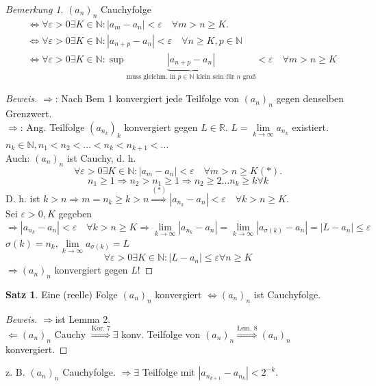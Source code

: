 \documentclass[12pt,a4paper,titlepage]{article} %
\theoremstyle{definition}
\newtheorem{satz}{Satz}[subsection]
\theoremstyle{remark}
\newtheorem*{bem}{Bemerkung}
\newenvironment{bew}{\begin{proof}[Beweis]}{\end{proof}}
\newcommand{\N}{\mathbb{N}}
\newcommand{\R}{\mathbb{R}}
\newcommand{\limes}[1]{\lim\limits_{#1\rightarrow\infty}}
\begin{document}
\begin{bem}
	\( (a_n)_n \) Cauchyfolge \\
	\begin{align*}
		&\Leftrightarrow \forall \varepsilon>0\exists K\in\N:|a_m-a_n|<\varepsilon \quad \forall m>n\geq K.\\
		&\Leftrightarrow \forall \varepsilon>0\exists K\in\N:|a_{n+p}-a_n|<\varepsilon \quad \forall n\geq K, p\in\N\\
		&\Leftrightarrow \forall \varepsilon>0\exists K\in\N:\sup \underbrace{|a_{n+p}-a_n|}_{\text{muss gleichm. in }p\in\N\text{ klein sein für } n \text{ groß} }<\varepsilon \quad \forall m>n\geq K
	\end{align*}
\end{bem}
\begin{bew}
	\glqq\( \Rightarrow \)\grqq: Nach Bem 1 konvergiert jede Teilfolge von \( (a_n)_n \) gegen denselben Grenzwert.\\
	\glqq\(\Rightarrow\)\grqq: Ang. Teilfolge \( (a_{n_k})_k \) konvergiert gegen \(L\in\R\). \(L = \limes{k} a_{n_k} \) existiert.\\
	\( n_k\in\N, n_1<n_2<\ldots<n_k<n_{k+1}<\ldots \)\\
	Auch: \((a_n)_n\) ist Cauchy, d. h. 
	\[ \forall \varepsilon>0\exists K\in\N:|a_m-a_n|<\varepsilon \quad\forall m>n\geq K (*). \]
	\[n_1 \geq 1 \Rightarrow n_2 > n_1 \geq 1 \Rightarrow n_2 \geq 2 \ldots n_k \geq k \forall k \]
	D. h. ist \(k>n \Rightarrow m=n_k \geq k>n \overset{(*)}{\Rightarrow} |a_{n_k}-a_n|<\varepsilon \quad \forall k>n\geq K \).\\
	Sei \( \varepsilon>0, K\) gegeben\\
	\[ \Rightarrow |a_{n_k} - a_n| <\varepsilon \quad \forall k>n\geq K \Rightarrow \limes{k} |a_{n_k}-a_n| = \limes{k} |a_{\sigma(k)}-a_n| = |L-a_n| \leq \varepsilon \]
	\(\sigma(k) = n_k, \limes{k} a_{\sigma(k)} = L \)
	\[ \forall \varepsilon>0 \exists K\in\N: |L-a_n|\leq \varepsilon \forall n\geq K \]
	\(\Rightarrow (a_n)_n\) konvergiert gegen \(L\)!
\end{bew}
\begin{satz}
	Eine (reelle) Folge \((a_n)_n\) konvergiert \( \Leftrightarrow (a_n)_n \) ist Cauchyfolge.
\end{satz}
\begin{bew}
	\glqq\(\Rightarrow\)\grqq ist Lemma 2.\\
	\glqq \( \Leftarrow \)\grqq \((a_n)_n\) Cauchy \( \overset{\text{Kor. 7}}{\Rightarrow} \exists \) konv. Teilfolge von \((a_n)_n \overset{\text{Lem. 8}}{\Rightarrow} (a_n)_n \) konvergiert. 
\end{bew}
z. B. \((a_n)_n\) Cauchyfolge. \(\Rightarrow \exists\) Teilfolge mit \(|a_{n_{k+1}}-a_{n_k}| <2^{-k}\).
\end{document}
